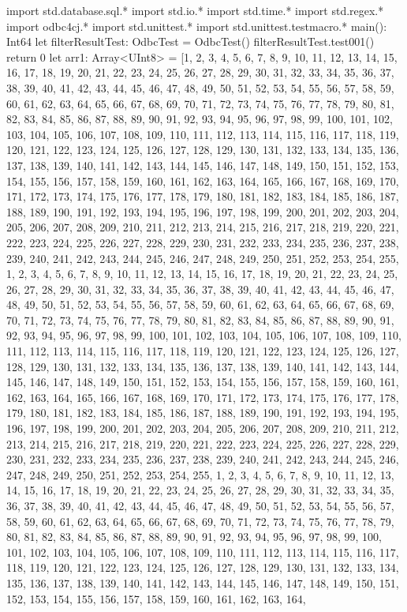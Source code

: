 import std.database.sql.*
import std.io.*
import std.time.*
import std.regex.*
import odbc4cj.*
import std.unittest.*
import std.unittest.testmacro.*
main(): Int64 {
    let filterResultTest: OdbcTest = OdbcTest()
    filterResultTest.test001()
    return 0
}
let arr1: Array<UInt8> = [1, 2, 3, 4, 5, 6, 7, 8, 9, 10, 11, 12, 13, 14, 15, 16, 17, 18, 19, 20, 21, 22, 23, 24, 25, 26, 27, 28, 29, 30, 31, 32, 33, 34, 35, 36, 37, 38, 39, 40, 41, 42, 43, 44, 45, 46, 47, 48, 49, 50, 51, 52, 53, 54, 55, 56, 57, 58, 59, 60, 61, 62, 63, 64, 65, 66, 67, 68, 69, 70, 71, 72, 73, 74, 75, 76, 77, 78, 79, 80, 81, 82, 83, 84, 85, 86, 87, 88, 89, 90, 91, 92, 93, 94, 95, 96, 97, 98, 99, 100, 101, 102, 103, 104, 105, 106, 107, 108, 109, 110, 111, 112, 113, 114, 115, 116, 117, 118, 119, 120, 121, 122, 123, 124, 125, 126, 127, 128, 129, 130, 131, 132, 133, 134, 135, 136, 137, 138, 139, 140, 141, 142, 143, 144, 145, 146, 147, 148, 149, 150, 151, 152, 153, 154, 155, 156, 157, 158, 159, 160, 161, 162, 163, 164, 165, 166, 167, 168, 169, 170, 171, 172, 173, 174, 175, 176, 177, 178, 179, 180, 181, 182, 183, 184, 185, 186, 187, 188, 189, 190, 191, 192, 193, 194, 195, 196, 197, 198, 199, 200, 201, 202, 203, 204, 205, 206, 207, 208, 209, 210, 211, 212, 213, 214, 215, 216, 217, 218, 219, 220, 221, 222, 223, 224, 225, 226, 227, 228, 229, 230, 231, 232, 233, 234, 235, 236, 237, 238, 239, 240, 241, 242, 243, 244, 245, 246, 247, 248, 249, 250, 251, 252, 253, 254, 255, 1, 2, 3, 4, 5, 6, 7, 8, 9, 10, 11, 12, 13, 14, 15, 16, 17, 18, 19, 20, 21, 22, 23, 24, 25, 26, 27, 28, 29, 30, 31, 32, 33, 34, 35, 36, 37, 38, 39, 40, 41, 42, 43, 44, 45, 46, 47, 48, 49, 50, 51, 52, 53, 54, 55, 56, 57, 58, 59, 60, 61, 62, 63, 64, 65, 66, 67, 68, 69, 70, 71, 72, 73, 74, 75, 76, 77, 78, 79, 80, 81, 82, 83, 84, 85, 86, 87, 88, 89, 90, 91, 92, 93, 94, 95, 96, 97, 98, 99, 100, 101, 102, 103, 104, 105, 106, 107, 108, 109, 110, 111, 112, 113, 114, 115, 116, 117, 118, 119, 120, 121, 122, 123, 124, 125, 126, 127, 128, 129, 130, 131, 132, 133, 134, 135, 136, 137, 138, 139, 140, 141, 142, 143, 144, 145, 146, 147, 148, 149, 150, 151, 152, 153, 154, 155, 156, 157, 158, 159, 160, 161, 162, 163, 164, 165, 166, 167, 168, 169, 170, 171, 172, 173, 174, 175, 176, 177, 178, 179, 180, 181, 182, 183, 184, 185, 186, 187, 188, 189, 190, 191, 192, 193, 194, 195, 196, 197, 198, 199, 200, 201, 202, 203, 204, 205, 206, 207, 208, 209, 210, 211, 212, 213, 214, 215, 216, 217, 218, 219, 220, 221, 222, 223, 224, 225, 226, 227, 228, 229, 230, 231, 232, 233, 234, 235, 236, 237, 238, 239, 240, 241, 242, 243, 244, 245, 246, 247, 248, 249, 250, 251, 252, 253, 254, 255, 1, 2, 3, 4, 5, 6, 7, 8, 9, 10, 11, 12, 13, 14, 15, 16, 17, 18, 19, 20, 21, 22, 23, 24, 25, 26, 27, 28, 29, 30, 31, 32, 33, 34, 35, 36, 37, 38, 39, 40, 41, 42, 43, 44, 45, 46, 47, 48, 49, 50, 51, 52, 53, 54, 55, 56, 57, 58, 59, 60, 61, 62, 63, 64, 65, 66, 67, 68, 69, 70, 71, 72, 73, 74, 75, 76, 77, 78, 79, 80, 81, 82, 83, 84, 85, 86, 87, 88, 89, 90, 91, 92, 93, 94, 95, 96, 97, 98, 99, 100, 101, 102, 103, 104, 105, 106, 107, 108, 109, 110, 111, 112, 113, 114, 115, 116, 117, 118, 119, 120, 121, 122, 123, 124, 125, 126, 127, 128, 129, 130, 131, 132, 133, 134, 135, 136, 137, 138, 139, 140, 141, 142, 143, 144, 145, 146, 147, 148, 149, 150, 151, 152, 153, 154, 155, 156, 157, 158, 159, 160, 161, 162, 163, 164, 